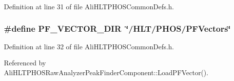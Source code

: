 Definition at line 31 of file Ali\-HLTPHOSCommon\-Defs.h.
\subsubsection{\setlength{\rightskip}{0pt plus 5cm}\#define PF\_\-VECTOR\_\-DIR\ \char`\"{}/HLT/PHOS/PFVectors\char`\"{}}\label{AliHLTPHOSCommonDefs_8h_a20}




Definition at line 32 of file Ali\-HLTPHOSCommon\-Defs.h.

Referenced by Ali\-HLTPHOSRaw\-Analyzer\-Peak\-Finder\-Component::Load\-PFVector().